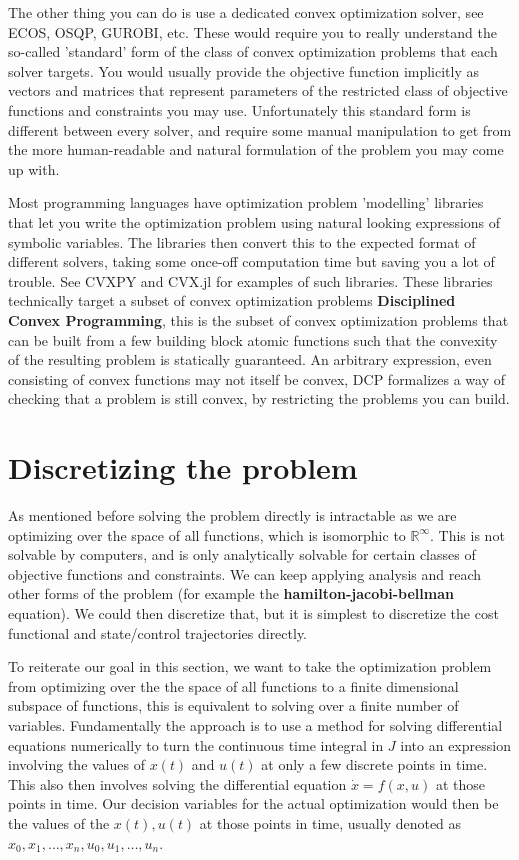 \documentclass[a4paper, 10pt, twocolumn]{article}
\newcommand{\R}{\mathbb{R}}
\begin{document}
The other thing you can do is use a dedicated convex optimization solver, see ECOS, OSQP, GUROBI, etc. These would require you to really understand the so-called 'standard' form of the class of convex optimization problems that each solver targets. You would usually provide the objective function implicitly as vectors and matrices that represent parameters of the restricted class of objective functions and constraints you may use. Unfortunately this standard form is different between every solver, and require some manual manipulation to get from the more human-readable and natural formulation of the problem you may come up with.

Most programming languages have optimization problem 'modelling' libraries that let you write the optimization problem using natural looking expressions of symbolic variables. The libraries then convert this to the expected format of different solvers, taking some once-off computation time but saving you a lot of trouble. See CVXPY and CVX.jl for examples of such libraries. These libraries technically target a subset of convex optimization problems \textbf{Disciplined Convex Programming}, this is the subset of convex optimization problems that can be built from a few building block atomic functions such that the convexity of the resulting problem is statically guaranteed. An arbitrary expression, even consisting of convex functions may not itself be convex, DCP formalizes a way of checking that a problem is still convex, by restricting the problems you can build.

\section{Discretizing the problem}

As mentioned before solving the problem directly is intractable as we are optimizing over the space of all functions, which is isomorphic to \(\R^\infty\). This is not solvable by computers, and is only analytically solvable for certain classes of objective functions and constraints. We can keep applying analysis and reach other forms of the problem (for example the \textbf{hamilton-jacobi-bellman} equation). We could then discretize that, but it is simplest to discretize the cost functional and state/control trajectories directly.

To reiterate our goal in this section, we want to take the optimization problem from optimizing over the the space of all functions to a finite dimensional subspace of functions, this is equivalent to solving over a finite number of variables.
Fundamentally the approach is to use a method for solving differential equations numerically to turn the continuous time integral in \(J\) into an expression involving the values of \(x(t)\) and \(u(t)\) at only a few discrete points in time. This also then involves solving the differential equation \(\dot{x} = f(x, u)\) at those points in time. Our decision variables for the actual optimization would then be the values of the \(x(t), u(t)\) at those points in time, usually denoted as \(x_0, x_1, \dots, x_n, u_0, u_1, \dots, u_n\).
\end{document}
